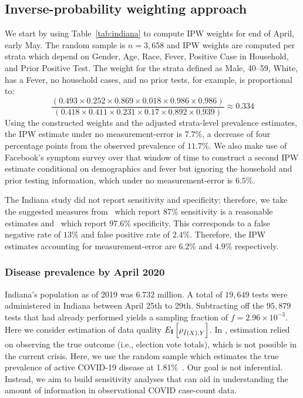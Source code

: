 \documentclass[11pt]{amsart}
\numberwithin{equation}{section}
\theoremstyle{plain}
\def\I{\bf I}
\begin{document}
\subsection{Inverse-probability weighting approach}
\label{section:ipwapproach}



We start by using Table~\ref{tab:indiana} to compute IPW weights for end of April, early May.  The random sample is $n=3,658$ and IPW weights are computed per strata which depend on Gender, Age, Race, Fever, Positive Case in Household, and Prior Positive Test.  The weight for the strata defined as Male, 40--59, White, has a Fever, no household cases, and no prior tests, for example, is proportional to:
$$
\frac{\left( 0.493 \times 0.252 \times 0.869 \times 0.018 \times 0.986 \times 0.986 \right)}{\left(0.418 \times 0.411 \times 0.231 \times 0.17 \times 0.892 \times 0.939 \right)} \approx 0.334
$$
Using the constructed weights and the adjusted strata-level prevalence estimates, the IPW estimate under no measurement-error is $7.7\%$, a decrease of four percentage points from the observed prevalence of $11.7\%$. We also make use of Facebook's symptom survey over that window of time to construct a second IPW estimate conditional on demographics and fever but ignoring the household and prior testing information, which under no measurement-error is $6.5$\%.

The Indiana study did not report sensitivity and specificity; therefore, we take the suggested measures from~\cite{Arevalo2020} which report 87\% sensitivity is a reasonable estimates and~\cite{Cohen2020} which report 97.6\% specificity.  This corresponds to a false negative rate of $13$\% and false positive rate of $2.4\%$.  Therefore, the IPW estimates accounting for measurement-error are $6.2\%$ and $4.9\%$ respectively.

\subsubsection{Disease prevalence by April 2020}

Indiana's population as of 2019 was $6.732$ million.  A total of $19,649$ tests were administered in Indiana between April 25th to 29th. Subtracting off the $95,879$ tests that had already performed yields a sampling fraction of $f = 2.96 \times 10^{-3}$.  Here we consider estimation of data quality $E_{\I} \left[ \rho_{\tilde I(X),Y} \right]$. In \cite{Meng2018}, estimation relied on observing the true outcome (i.e., election vote totals), which is not possible in the current crisis.  Here, we use the random sample which estimates the true prevalence of active COVID-19 disease at 1.81\%~\cite{Yiannoutsos2021}.  Our goal is not inferential. Instead, we aim to build sensitivity analyses that can aid in understanding the amount of information in observational COVID case-count data.
\end{document}
